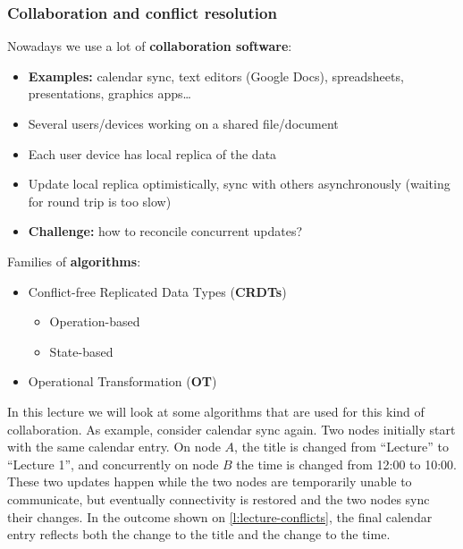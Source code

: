 \begin{frame}
    \label{s:collaboration}
    \frametitle{Collaboration and conflict resolution}
    Nowadays we use a lot of \textbf{collaboration software}:
    \begin{itemize}
        \item \textbf{Examples:} calendar sync, text editors (Google Docs), spreadsheets, presentations, graphics apps\dots\pause
        \item Several users/devices working on a shared file/document
        \item Each user device has local replica of the data\pause
        \item Update local replica optimistically, sync with others asynchronously (waiting for round trip is too slow)\pause
        \item \textbf{Challenge:} how to reconcile concurrent updates?\\[1em]\pause
    \end{itemize}
    Families of \textbf{algorithms}:
    \begin{itemize}
        \item Conflict-free Replicated Data Types (\textbf{CRDTs})
            \begin{itemize}
                \item Operation-based
                \item State-based
            \end{itemize}
        \item Operational Transformation (\textbf{OT})
    \end{itemize}
\end{frame}
\label{l:collaboration}

In this lecture we will look at some algorithms that are used for this kind of collaboration.
As example, consider calendar sync again.
Two nodes initially start with the same calendar entry.
On node $A$, the title is changed from ``Lecture'' to ``Lecture 1'', and concurrently on node $B$ the time is changed from 12:00 to 10:00.
These two updates happen while the two nodes are temporarily unable to communicate, but eventually connectivity is restored and the two nodes sync their changes.
In the outcome shown on \autoref{l:lecture-conflicts}, the final calendar entry reflects both the change to the title and the change to the time.

